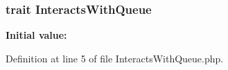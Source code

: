 \subsubsection[{Interacts\+With\+Queue}]{\setlength{\rightskip}{0pt plus 5cm}trait Interacts\+With\+Queue}\label{namespace_illuminate_1_1_queue_abb7979e986d32e634f260be307d62311}
{\bfseries Initial value\+:}


Definition at line 5 of file Interacts\+With\+Queue.\+php.

